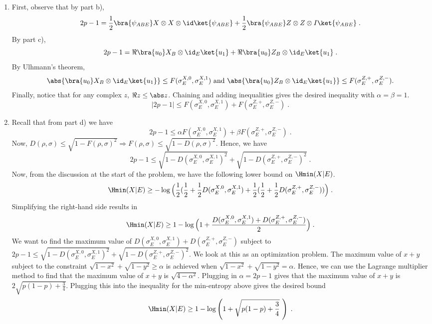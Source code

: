 \begin{exercises}
\begin{enumerate}
\item First, observe that by part b),
\[
 2p-1
 = \frac 12\bra{\psi_{ABE}} X\otimes X \otimes \id \ket{\psi_{ABE}}+ \frac 12\bra{\psi_{ABE}} Z\otimes Z \otimes I \ket{\psi_{ABE}}\;.
 \]
By part c),
\[
 2p-1
 =\Re\bra{u_0}X_B\otimes \id_E\ket{u_1}
 +\Re\bra{u_0}Z_B\otimes \id_E\ket{u_1}\;.
 \]
 By Ulhmann's theorem,
 \[
\abs{\bra{u_0}X_B\otimes \id_E\ket{u_1}} \leq F(\sigma_E^{X,0},\sigma_E^{X,1}) \text{ and }
\abs{\bra{u_0}Z_B\otimes \id_E\ket{u_1}} \leq F(\sigma_E^{Z,+},\sigma_E^{Z,-}).
 \]
 Finally, notice that for any complex $z$, $\Re z \leq \abs z$. Chaining and adding inequalities gives the desired inequality with $\alpha = \beta = 1$.
 \[
|2p-1| \leq  F(\sigma_E^{X,0},\sigma_E^{X,1}) +  F(\sigma_E^{Z,+},\sigma_E^{Z,-})\;.
 \]

\item Recall that from part d) we have
\begin{equation*}
2p-1 \leq \alpha F(\sigma_E^{X,0},\sigma_E^{X,1}) + \beta F(\sigma_E^{Z,+},\sigma_E^{Z,-})\;.
\end{equation*}
Now, $D(\rho,\sigma) \leq \sqrt{1-F(\rho,\sigma)^2} \Rightarrow F(\rho,\sigma) \leq \sqrt{1-D(\rho,\sigma)^2}$. Hence, we have
\begin{equation*}
2p-1 \leq \sqrt{1-D(\sigma_E^{X,0},\sigma_E^{X,1})^2} + \sqrt{1-D(\sigma_E^{Z,+},\sigma_E^{Z,-})^2}\;.
\end{equation*}
Now, from the discussion at the start of the problem, we have the following lower bound on $\Hmin (X|E)$.
\begin{equation*}
\Hmin (X|E) \geq -\log \Big(\frac12(\frac12+\frac12 D(\sigma_E^{X,0},\sigma_E^{X,1}) +\frac12(\frac12+\frac12 D(\sigma_E^{Z,+},\sigma_E^{Z,-}))\Big)\;. \\
\end{equation*}
Simplifying the right-hand side results in
\begin{equation*}
\Hmin (X|E) \geq 1 - \log \Big(1 + \frac{D(\sigma_E^{X,0},\sigma_E^{X,1}) + D(\sigma_E^{Z,+},\sigma_E^{Z,-})}{2}\Big)\;.
\end{equation*}
We want to find the maximum value of $D(\sigma_E^{X,0},\sigma_E^{X,1}) + D(\sigma_E^{Z,+},\sigma_E^{Z,-})$ subject to $2p-1 \leq \sqrt{1-D(\sigma_E^{X,0},\sigma_E^{X,1})^2} + \sqrt{1-D(\sigma_E^{Z,+},\sigma_E^{Z,-})^2}$.
We look at this as an optimization problem. The maximum value of $x+y$ subject to the constraint $\sqrt{1-x^2} + \sqrt{1-y^2} \geq \alpha$ is achieved when $\sqrt{1-x^2} + \sqrt{1-y^2} = \alpha$. Hence, we can use the Lagrange multiplier method to find that the maximum value of $x+y$ is $\sqrt{4-\alpha^2}$. Plugging in $\alpha = 2p-1$ gives that the maximum value of $x+y$ is $2\sqrt{p(1-p)+\frac34}$. Plugging this into the inequality for the min-entropy above gives the desired bound
\begin{equation*}
\Hmin (X|E) \geq 1 - \log\left(1+\sqrt{p(1-p)+ \frac34}\,\,\right)\;.
\end{equation*}
\end{enumerate}



\end{exercises}
